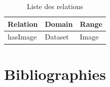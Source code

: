 \documentclass{article}
\begin{document}
	
	\begin{table}[htbp]
		\centering
		\begin{tabular}{|p{5cm}|p{5cm}|p{5cm}|} %
			\hline
			\textbf{Relation} & \textbf{Domain} & \textbf{Range} \\
			\hline
			hasImage & Dataset & Image \\
			\hline
		\end{tabular}
		\caption{Liste des relations}

	\end{table}
	

	\newpage
	\section{Bibliographies}
	
	
\end{document}
